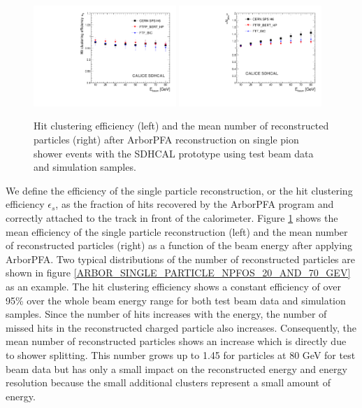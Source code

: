 \documentclass[cits]{JINST}
\begin{document}
\begin{figure}[!h]
  \begin{center}
    \includegraphics[width=0.48\textwidth]{plots/SingleParticle/CALICESDHCAL/MC_DATA_COMP/Single_MC_DATA_COMP_Efficiency.pdf}
    \includegraphics[width=0.48\textwidth]{plots/SingleParticle/CALICESDHCAL/MC_DATA_COMP/Single_MC_DATA_COMP_NPfos.pdf} \\
  \end{center}
  \caption{\label{ARBOR_SINGLE_PARTICLE_EFFICIENCY_AND_NPFOS} Hit clustering efficiency (left) and the mean number of reconstructed particles (right) after ArborPFA reconstruction on single pion shower events with the SDHCAL prototype using test beam data and simulation samples.}
\end{figure}

We define the efficiency of the single particle reconstruction, or the hit clustering efficiency $\epsilon_s$, as the fraction of hits recovered by the ArborPFA program and correctly attached to the track in front of the calorimeter. Figure \ref{ARBOR_SINGLE_PARTICLE_EFFICIENCY_AND_NPFOS} shows the mean efficiency of the single particle reconstruction (left) and the mean number of reconstructed particles (right) as a function of the beam energy after applying ArborPFA. Two typical distributions of the number of reconstructed particles are shown in figure \ref{ARBOR_SINGLE_PARTICLE_NPFOS_20_AND_70_GEV} as an example. The hit clustering efficiency shows a constant efficiency of over 95\% over the whole beam energy range for both test beam data and simulation samples. Since the number of hits increases with the energy, the number of missed hits in the reconstructed charged particle also increases. Consequently, the mean number of reconstructed particles shows an increase which is directly due to shower splitting. This number grows up to 1.45 for particles at 80 GeV for test beam data but has only a small impact on the reconstructed energy and energy resolution because the small additional clusters represent a small amount of energy.
\end{document}
